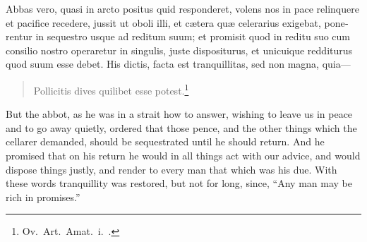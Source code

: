 \documentclass[10pt]{book}
\begin{document}
\begin{paracol}{2}
\switchcolumn*

\begin{otherlanguage}{latin}
Abbas vero, quasi in arcto positus quid responderet, volens nos in pace relinquere et pacifice recedere, jussit ut oboli illi, et c\ae{}tera qu\ae{} celerarius exigebat, ponerentur in sequestro usque ad reditum suum; et promisit quod in reditu suo cum consilio nostro operaretur in singulis, juste dispositurus, et unicuique redditurus quod suum esse debet. His dictis, facta est tranquillitas, sed non magna, quia---
\begin{verse}
Pollicitis dives quilibet esse potest.\footnote[\textdagger]{Ov.\ Art.\ Amat.\ i.\ .}
\end{verse}

\end{otherlanguage}

\switchcolumn

But the abbot, as he was in a strait how to answer, wishing to leave us in peace and to go away quietly, ordered that those pence, and the other things which the cellarer demanded, should be sequestrated until he should return. And he promised that on his return he would in all things act with our advice, and would dispose things justly, and render to every man that which was his due. With these words tranquillity was restored, but not for long, since, ``Any man may be rich in promises.''

\end{paracol}
\end{document}

